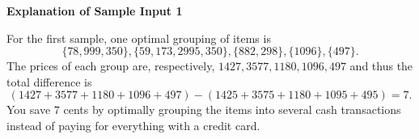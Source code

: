 \textbf{Explanation of Sample Input 1}


For the first sample, one optimal grouping of items is
\[\{78, 999, 350\}, \{59, 173, 2995, 350\}, \{882, 298\}, \{1096\}, \{497\}.\]
The prices of each group are, respectively, $1427, 3577, 1180, 1096, 497$ and thus the total difference is
\[(1427 + 3577 + 1180 + 1096 + 497) - (1425 + 3575 + 1180 + 1095 + 495) = 7.\] 
You save $7$ cents by optimally grouping the items into several cash transactions instead of paying for everything with a credit card.